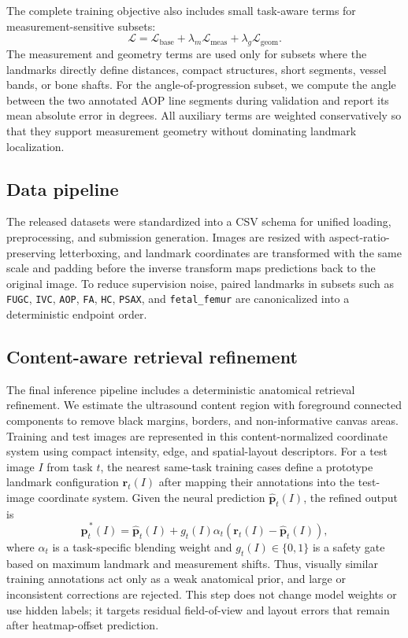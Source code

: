 \documentclass[runningheads]{llncs}
\begin{document}
The complete training objective also includes small task-aware terms for measurement-sensitive subsets:
\begin{equation}
\mathcal{L} =
\mathcal{L}_{\text{base}}
+ \lambda_m \mathcal{L}_{\text{meas}}
+ \lambda_g \mathcal{L}_{\text{geom}}.
\end{equation}
The measurement and geometry terms are used only for subsets where the landmarks directly define distances, compact structures, short segments, vessel bands, or bone shafts. For the angle-of-progression subset, we compute the angle between the two annotated AOP line segments during validation and report its mean absolute error in degrees. All auxiliary terms are weighted conservatively so that they support measurement geometry without dominating landmark localization.


\subsection{Data pipeline}
The released datasets were standardized into a CSV schema for unified loading, preprocessing, and submission generation. Images are resized with aspect-ratio-preserving letterboxing, and landmark coordinates are transformed with the same scale and padding before the inverse transform maps predictions back to the original image. To reduce supervision noise, paired landmarks in subsets such as \texttt{FUGC}, \texttt{IVC}, \texttt{AOP}, \texttt{FA}, \texttt{HC}, \texttt{PSAX}, and \texttt{fetal\_femur} are canonicalized into a deterministic endpoint order.

\subsection{Content-aware retrieval refinement}
\label{sec:retrieval-refinement}
The final inference pipeline includes a deterministic anatomical retrieval refinement. We estimate the ultrasound content region with foreground connected components to remove black margins, borders, and non-informative canvas areas. Training and test images are represented in this content-normalized coordinate system using compact intensity, edge, and spatial-layout descriptors. For a test image $I$ from task $t$, the nearest same-task training cases define a prototype landmark configuration $\mathbf{r}_t(I)$ after mapping their annotations into the test-image coordinate system. Given the neural prediction $\hat{\mathbf{p}}_t(I)$, the refined output is
\begin{equation}
\hat{\mathbf{p}}^{\,*}_t(I)=
\hat{\mathbf{p}}_t(I)+
g_t(I)\alpha_t\left(\mathbf{r}_t(I)-\hat{\mathbf{p}}_t(I)\right),
\end{equation}
where $\alpha_t$ is a task-specific blending weight and $g_t(I)\in\{0,1\}$ is a safety gate based on maximum landmark and measurement shifts. Thus, visually similar training annotations act only as a weak anatomical prior, and large or inconsistent corrections are rejected. This step does not change model weights or use hidden labels; it targets residual field-of-view and layout errors that remain after heatmap-offset prediction.
\end{document}
